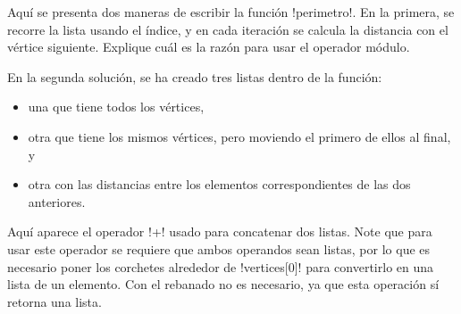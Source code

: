 \documentclass[10pt]{article}
\begin{document}
  Aquí se presenta dos maneras de escribir la función \li!perimetro!.
  En la primera, se recorre la lista usando el índice,
  y en cada iteración se calcula la distancia con el vértice siguiente.
  Explique cuál es la razón para usar el operador módulo.

  En la segunda solución,
  se ha creado tres listas dentro de la función:
  \begin{itemize}
    \item una que tiene todos los vértices,
    \item otra que tiene los mismos vértices, pero moviendo el primero de ellos al final, y
    \item otra con las distancias entre los elementos correspondientes de las dos anteriores.
  \end{itemize}
  Aquí aparece el operador \li!+! usado para concatenar dos listas.
  Note que para usar este operador se requiere que ambos operandos sean listas,
  por lo que es necesario poner los corchetes alrededor de \li!vertices[0]!
  para convertirlo en una lista de un elemento.
  Con el rebanado no es necesario, ya que esta operación sí retorna una lista.
\end{document}
